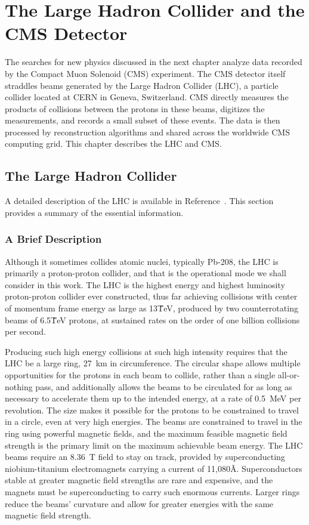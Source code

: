 \chapter{The Large Hadron Collider and the CMS Detector}

The searches for new physics discussed in the next chapter analyze data recorded by the Compact Muon Solenoid (CMS) experiment.
The CMS detector itself straddles beams generated by the Large Hadron Collider (LHC), a particle collider located at CERN in Geneva, Switzerland.
CMS directly measures the products of collisions between the protons in these beams, digitizes the measurements, and records a small subset of these events.
The data is then processed by reconstruction algorithms and shared across the worldwide CMS computing grid.
This chapter describes the LHC and CMS.

\section{The Large Hadron Collider} \label{sec:LHC}

A detailed description of the LHC is available in Reference~\cite{LHC_TDR}.
This section provides a summary of the essential information.

  \subsection{A Brief Description} \label{sec:LHCdescription}

  Although it sometimes collides atomic nuclei, typically Pb-208, the LHC is primarily a proton-proton collider, and that is the operational mode we shall consider in this work.
  The LHC is the highest energy and highest luminosity proton-proton collider ever constructed, thus far achieving collisions with center of momentum frame energy as large as 13\~TeV, produced by two counterrotating beams of 6.5\~TeV protons, at sustained rates on the order of one billion collisions per second.

  Producing such high energy collisions at such high intensity requires that the LHC be a large ring, 27~km in circumference.
  The circular shape allows multiple opportunities for the protons in each beam to collide, rather than a single all-or-nothing pass, and additionally allows the beams to be circulated for as long as necessary to accelerate them up to the intended energy, at a rate of 0.5~MeV per revolution.
  The size makes it possible for the protons to be constrained to travel in a circle, even at very high energies.
  The beams are constrained to travel in the ring using powerful magnetic fields, and the maximum feasible magnetic field strength is the primary limit on the maximum achievable beam energy.
  The LHC beams require an 8.36~T field to stay on track, provided by superconducting niobium-titanium electromagnets carrying a current of 11,080\~A.
  Superconductors stable at greater magnetic field strengths are rare and expensive, and the magnets must be superconducting to carry such enormous currents.
  Larger rings reduce the beams' curvature and allow for greater energies with the same magnetic field strength.

